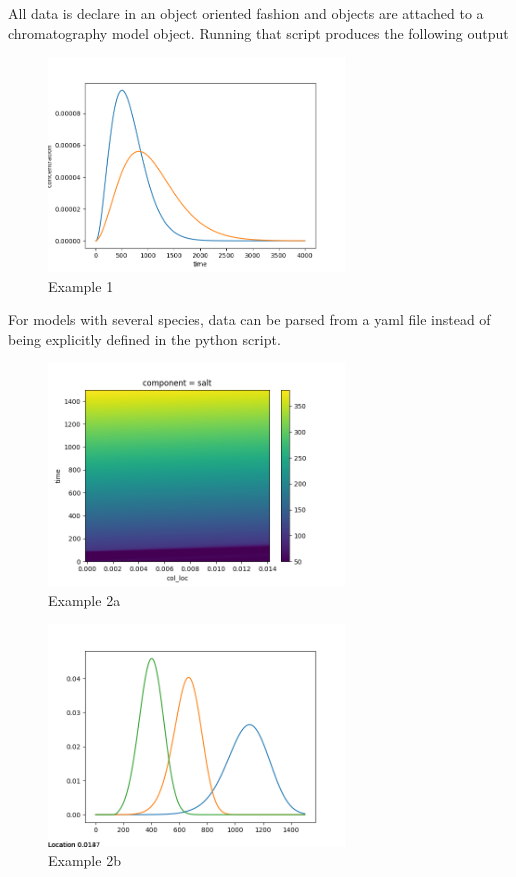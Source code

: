 \documentclass[paper=a4, fontsize=11pt]{scrartcl}
\begin{document}


All data is declare in an object oriented fashion and objects are attached to a chromatography model object. Running that script produces the following output 

\begin{figure}[!h]
\label{objects}
\centering
\includegraphics[width=0.7\textwidth]{example1.png}
\caption{Example 1}
\end{figure}

For models with several species, data can be parsed from a yaml file instead of being explicitly defined in the python script.



\begin{figure}[!h]
\label{objects}
\centering
\includegraphics[width=0.7\textwidth]{example2a.png}
\caption{Example 2a}
\end{figure}

\begin{figure}[!h]
\label{objects}
\centering
\includegraphics[width=0.7\textwidth]{example2b.png}
\caption{Example 2b}
\end{figure}
\end{document}
